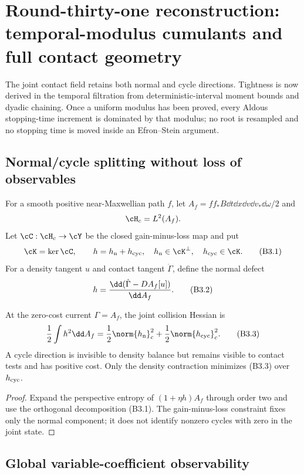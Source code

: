 \section{Round-thirty-one reconstruction: temporal-modulus cumulants and full contact geometry}
\label{sec:r31-b3}

The joint contact field retains both normal and cycle directions.  Tightness is
now derived in the temporal filtration from deterministic-interval moment
bounds and dyadic chaining.  Once a uniform modulus has been proved, every
Aldous stopping-time increment is dominated by that modulus; no root is
resampled and no stopping time is moved inside an Efron--Stein argument.

\subsection{Normal/cycle splitting without loss of observables}

For a smooth positive near-Maxwellian path $f$, let
$A_f=ff_*B\dd t\dd x\dd v\dd v_*\dd\omega/2$ and
\[
 \cH_c=L^2(A_f).
\]
Let $\cC:\cH_c\to\cY$ be the closed gain-minus-loss map and put
\[
 \cK=\ker\cC,\qquad
 h=h_{\rm n}+h_{\rm cyc},\quad
 h_{\rm n}\in\cK^\perp,\quad h_{\rm cyc}\in\cK.          \tag{B3.1}
\]
For a density tangent $u$ and contact tangent $\dot\Gamma$, define the normal
defect
\[
 h={\dd(\dot\Gamma-DA_f[u])\over\dd A_f}.                 \tag{B3.2}
\]

\begin{lemma}
\label{lem:r31-b3-hessian}
At the zero-cost current $\Gamma=A_f$, the joint collision Hessian is
\[
 {1\over2}\int h^2\dd A_f
 ={1\over2}\norm{h_{\rm n}}_c^2
  +{1\over2}\norm{h_{\rm cyc}}_c^2.                      \tag{B3.3}
\]
A cycle direction is invisible to density balance but remains visible to
contact tests and has positive cost.  Only the density contraction minimizes
(B3.3) over $h_{\rm cyc}$.
\end{lemma}

\begin{proof}
Expand the perspective entropy of
$(1+\eta h)A_f$ through order two and use the orthogonal decomposition
(B3.1).  The gain-minus-loss constraint fixes only the normal component; it
does not identify nonzero cycles with zero in the joint state.
\end{proof}

\subsection{Global variable-coefficient observability}

